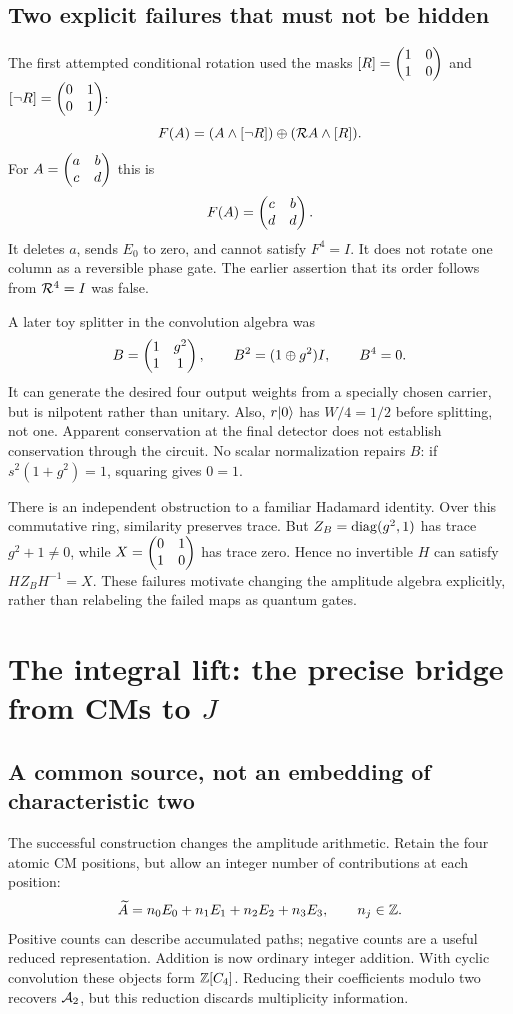 \subsection{Two explicit failures that must not be hidden}
The first attempted conditional rotation used the masks $[R]=\begin{pmatrix}1&0\\1&0\end{pmatrix}$ and $[\neg R]=\begin{pmatrix}0&1\\0&1\end{pmatrix}$:
\begin{equation}
 F(A)=(A\land[\neg R])\oplus(\mathcal R A\land[R]).
\end{equation}
For $A=\begin{pmatrix}a&b\\c&d\end{pmatrix}$ this is
\begin{equation}\label{eq:badmask}
 F(A)=\begin{pmatrix}c&b\\d&d\end{pmatrix}.
\end{equation}
It deletes $a$, sends $E_0$ to zero, and cannot satisfy $F^4=I$. It does not rotate one column as a reversible phase gate. The earlier assertion that its order follows from $\mathcal R^4=I$ was false.

A later toy splitter in the convolution algebra was
\begin{equation}
 B=\begin{pmatrix}1&g^2\\1&1\end{pmatrix},\qquad B^2=(1\oplus g^2)I,
 \qquad B^4=0.
\end{equation}
It can generate the desired four output weights from a specially chosen carrier, but is nilpotent rather than unitary. Also, $r\lvert 0\rangle$ has $W/4=1/2$ before splitting, not one. Apparent conservation at the final detector does not establish conservation through the circuit. No scalar normalization repairs $B$: if $s^2(1+g^2)=1$, squaring gives $0=1$.

There is an independent obstruction to a familiar Hadamard identity. Over this commutative ring, similarity preserves trace. But $Z_B=\operatorname{diag}(g^2,1)$ has trace $g^2+1\ne0$, while $X=\begin{pmatrix}0&1\\1&0\end{pmatrix}$ has trace zero. Hence no invertible $H$ can satisfy $HZ_BH^{-1}=X$. These failures motivate changing the amplitude algebra explicitly, rather than relabeling the failed maps as quantum gates.

\section{The integral lift: the precise bridge from CMs to \texorpdfstring{$J$}{J}}\label{sec:lift}
\subsection{A common source, not an embedding of characteristic two}
The successful construction changes the amplitude arithmetic. Retain the four atomic CM positions, but allow an integer number of contributions at each position:
\begin{equation}
 \widetilde A=n_0E_0+n_1E_1+n_2E_2+n_3E_3,
 \qquad n_j\in\mathbb Z.
\end{equation}
Positive counts can describe accumulated paths; negative counts are a useful reduced representation. Addition is now ordinary integer addition. With cyclic convolution these objects form $\mathbb Z[C_4]$. Reducing their coefficients modulo two recovers $\mathcal A_2$, but this reduction discards multiplicity information.

